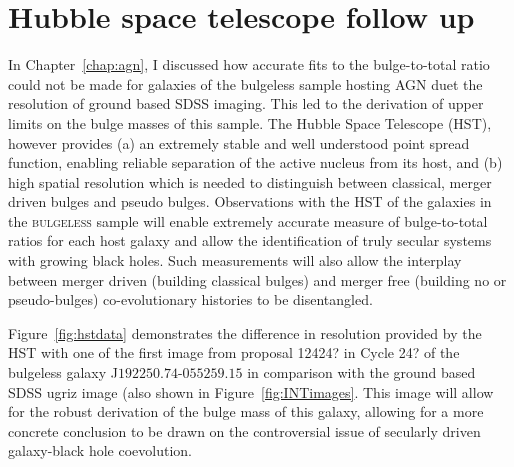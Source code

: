 \section{Hubble space telescope follow up}\label{sec:hst}

In Chapter~\ref{chap:agn}, I discussed how accurate fits to the bulge-to-total ratio could not be made for galaxies of the bulgeless sample hosting AGN duet the resolution of ground based SDSS imaging. This led to the derivation of upper limits on the bulge masses of this sample. The Hubble Space Telescope (HST), however provides (a) an extremely stable and well understood point spread function, enabling reliable separation of the active nucleus from its host, and (b) high spatial resolution which is needed to distinguish between classical, merger driven bulges and pseudo bulges. Observations with the HST of the galaxies in the \textsc{bulgeless} sample will enable extremely accurate measure of bulge-to-total ratios for each host galaxy and allow the identification of truly secular systems with growing black holes. Such measurements will also allow the interplay between merger driven (building classical bulges) and merger free (building no or pseudo-bulges) co-evolutionary histories to be disentangled. 

Figure~\ref{fig:hstdata} demonstrates the difference in resolution provided by the HST with one of the first image from proposal 12424? in Cycle 24? of the bulgeless galaxy J$192250.74$-$055259.15$ in comparison with the ground based SDSS ugriz image (also shown in Figure~\ref{fig:INTimages}. This image will allow for the robust derivation of the bulge mass of this galaxy, allowing for a more concrete conclusion to be drawn on the controversial issue of secularly driven galaxy-black hole coevolution. 


